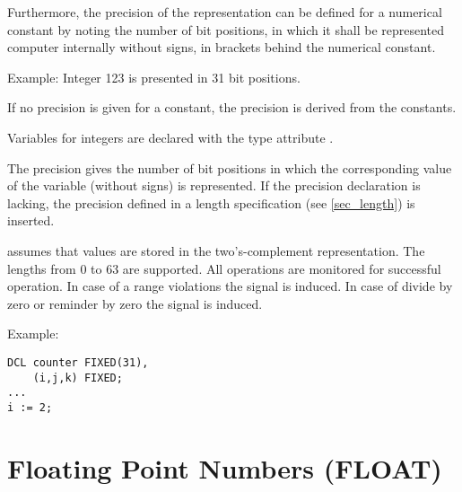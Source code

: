 Furthermore, the precision of the representation can be defined for a
numerical constant by noting the number of bit positions, in which it
shall be represented computer internally without signs, in brackets behind
the numerical constant.

Example:  \x Integer 123 is presented in 31 bit positions.

If no precision is given for a constant,
the precision is derived from the constants.

Variables for integers are declared with the type attribute .
\begin{grammarframe}
\end{grammarframe}

The precision gives the number of bit positions in which the
corresponding value of the variable (without signs) is represented. If
the precision declaration is lacking, the precision defined in a length
specification (see \ref{sec_length}) is inserted. 

\OpenPEARL{} assumes that  values are stored in 
the two's-complement representation.
The lengths from 0 to 63 are supported.
All operations are monitored for successful operation.
In case of a range violations the signal  is induced.
In case of divide by zero or reminder by zero the signal 
is induced.

Example:

\begin{lstlisting}
DCL counter FIXED(31),
    (i,j,k) FIXED;
...
i := 2;
\end{lstlisting}

\section{Floating Point Numbers (FLOAT)}  %
\label{sec_type_float}

